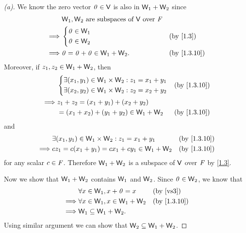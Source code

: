 \begin{proof}[(a)]
  We know the zero vector \(\mathit{0} \in \mathsf{V}\) is also in \(\mathsf{W}_1 + \mathsf{W}_2\) since
  \begin{align*}
             & \W_1, \W_2 \text{ are subspaces of } \V \text{ over } \F                                \\
    \implies & \begin{dcases}
      \zv \in \W_1 \\
      \zv \in \W_2
    \end{dcases}                               &  & \text{(by \cref{1.3})}    \\
    \implies & \zv = \zv + \zv \in \W_1 + \W_2.                         &  & \text{(by \cref{1.3.10})}
  \end{align*}
  Moreover, if \(z_1, z_2 \in \mathsf{W}_1 + \mathsf{W}_2\), then
  \begin{align*}
             & \begin{dcases}
      \exists (x_1, y_1) \in \W_1 \times \W_2 : z_1 = x_1 + y_1 \\
      \exists (x_2, y_2) \in \W_1 \times \W_2 : z_2 = x_2 + y_2
    \end{dcases}                  &  & \text{(by \cref{1.3.10})} \\
    \implies & z_1 + z_2 = (x_1 + y_1) + (x_2 + y_2)                                      \\
             & = (x_1 + x_2) + (y_1 + y_2) \in \W_1 + \W_2 &  & \text{(by \cref{1.3.10})}
  \end{align*}
  and
  \begin{align*}
             & \exists (x_1, y_1) \in \W_1 \times \W_2 : z_1 = x_1 + y_1 &  & \text{(by \cref{1.3.10})} \\
    \implies & cz_1 = c(x_1 + y_1) = cx_1 + cy_1 \in \W_1 + \W_2         &  & \text{(by \cref{1.3.10})}
  \end{align*}
  for any scalar \(c \in \mathit{F}\).
  Therefore \(\mathsf{W}_1 + \mathsf{W}_2\) is a subspace of \(\mathsf{V}\) over \(\mathit{F}\) by \cref{1.3}.

  Now we show that \(\mathsf{W}_1 + \mathsf{W}_2\) contains \(\mathsf{W}_1\) and \(\mathsf{W}_2\).
  Since \(\mathit{0} \in \mathsf{W}_2\), we know that
  \begin{align*}
             & \forall x \in \W_1, x + \zv = x       &  & \text{(by \ref{vs3})}     \\
    \implies & \forall x \in \W_1, x \in \W_1 + \W_2 &  & \text{(by \cref{1.3.10})} \\
    \implies & \W_1 \subseteq \W_1 + \W_2.
  \end{align*}
  Using similar argument we can show that \(\mathsf{W}_2 \subseteq \mathsf{W}_1 + \mathsf{W}_2\).
\end{proof}

